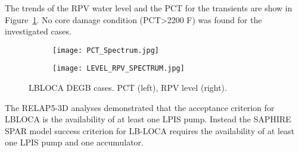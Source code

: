 The trends of the RPV water level and the PCT for the transients are show in Figure~\ref{fig:r5_plots_otherCases}. 
No core damage condition (PCT>2200 F) was found for the investigated cases. 

\begin{figure}
  \centering
  \begin{subfigure}{.5\textwidth}
    \centering
    \centerline{\texttt{[image: PCT\_Spectrum.jpg]}}
  \end{subfigure}%
  \begin{subfigure}{.5\textwidth}
    \centering
    \centerline{\texttt{[image: LEVEL\_RPV\_SPECTRUM.jpg]}}
  \end{subfigure}
  \caption{LBLOCA DEGB cases. PCT (left), RPV level (right).}
  \label{fig:r5_plots_otherCases}
\end{figure}

The RELAP5-3D analyses demonstrated that the acceptance criterion for LBLOCA is the availability of at least one LPIS pump.  Instead the SAPHIRE SPAR model success criterion for LB-LOCA requires the availability of at least one LPIS pump and one accumulator. 
